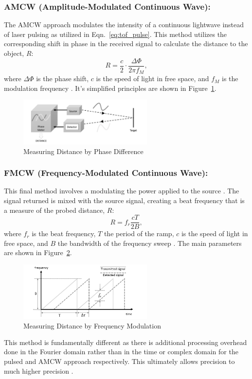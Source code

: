 \documentclass[12pt]{article}
\begin{document}
\subsubsection{AMCW (Amplitude-Modulated Continuous Wave):}
The AMCW approach modulates the intensity of a continuous lightwave instead of
laser pulsing as utilized in Eqn.~\ref{eq:tof_pulse}. This method utilizes the
corresponding shift in phase in the received signal to calculate the distance to
the object, $R$:
\begin{equation}
R = \frac{c}{2} \cdot \frac{\Delta\Phi}{2\pi f_M},
\label{eq:amcw}
\end{equation}
where \( \Delta\Phi \) is the phase shift, $c$ is the speed of light in free
space, and \( f_M \) is the modulation
frequency \cite{2019Royo}. It's simplified principles are shown in
Figure~\ref{fig:amcw}.
\begin{figure}[H]
	\centering
	\includegraphics[width=0.6\textwidth]{amcw}
	\caption{Measuring Distance by Phase Difference \cite{2019Royo}}
	\label{fig:amcw}
\end{figure}
\subsubsection{FMCW (Frequency-Modulated Continuous Wave):}
This final method involves a modulating the power applied to the source
\cite{petermannopto}. The signal returned is mixed with the source signal,
creating a beat frequency that is a measure of the probed distance, $R$:
\begin{equation}
R = f_r\frac{c T}{2B},
\label{eq:fmcw}
\end{equation}
where \( f_r \) is the beat frequency, \( T \) the period of the ramp, $c$ is
the speed of light in free space, and \( B \)
the bandwidth of the frequency sweep \cite{2019Royo}. The main parameters are
shown in Figure~\ref{fig:fmcw}.
\begin{figure}[H]
	\centering
	\includegraphics[width=0.6\textwidth]{fmcw}
	\caption{Measuring Distance by Frequency Modulation \cite{2019Royo}}
	\label{fig:fmcw}
\end{figure}
This method is fundamentally different as there is additional processing
overhead done in the Fourier domain rather than in the time or complex domain
for the pulsed and AMCW approach respectively. This ultimately allows precision
to much higher precision \cite{petermannopto}.
\end{document}
